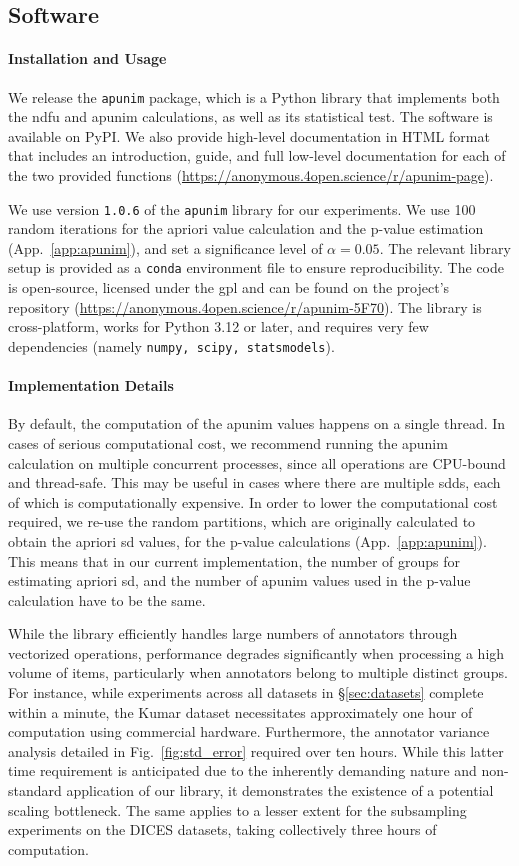\documentclass[manuscript,screen,review,anonymous]{acmart}
\theoremstyle{acmplain}
\theoremstyle{researchquestionstyle}
\newcommand{\librarylink}{\url{https://anonymous.4open.science/r/apunim-5F70}}
\newcommand{\doclink}{\url{https://anonymous.4open.science/r/apunim-page}}
\begin{document}
\subsection{Software}

\paragraph{Installation and Usage}
We release the \texttt{apunim} package, which is a Python library that implements both the \ac{ndfu} and apunim calculations, as well as its statistical test. The software is available on PyPI. We also provide high-level documentation in HTML format that includes an introduction, guide, and full low-level documentation for each of the two provided functions (\doclink).

We use version \texttt{1.0.6} of the \texttt{apunim} library for our experiments. We use 100 random iterations for the apriori value calculation and the p-value estimation (App.~\ref{app:apunim}), and set a significance level of $\alpha=0.05$. The relevant library setup is provided as a \texttt{conda} environment file to ensure reproducibility. The code is open-source, licensed under the \ac{gpl} and can be found on the project's repository (\librarylink). The library is cross-platform, works for Python 3.12 or later, and requires very few dependencies (namely \texttt{numpy, scipy, statsmodels}).

\paragraph{Implementation Details}
By default, the computation of the apunim values happens on a single thread. In cases of serious computational cost, we recommend running the apunim calculation on multiple concurrent processes, since all operations are CPU-bound and thread-safe. This may be useful in cases where there are multiple \acp{sdd}, each of which is computationally expensive. In order to lower the computational cost required, we re-use the random partitions, which are originally calculated to obtain the apriori \ac{sd} values, for the p-value calculations (App.~\ref{app:apunim}). This means that in our current implementation, the number of groups for estimating apriori \ac{sd}, and the number of apunim values used in the p-value calculation have to be the same.

While the library efficiently handles large numbers of annotators through vectorized operations, performance degrades significantly when processing a high volume of items, particularly when annotators belong to multiple distinct groups. For instance, while experiments across all datasets in \S\ref{sec:datasets} complete within a minute, the Kumar dataset necessitates approximately one hour of computation using commercial hardware. Furthermore, the annotator variance analysis detailed in Fig.~\ref{fig:std_error} required over ten hours. While this latter time requirement is anticipated due to the inherently demanding nature and non-standard application of our library, it demonstrates the existence of a potential scaling bottleneck. The same applies to a lesser extent for the subsampling experiments on the DICES datasets, taking collectively three hours of computation.
\end{document}
